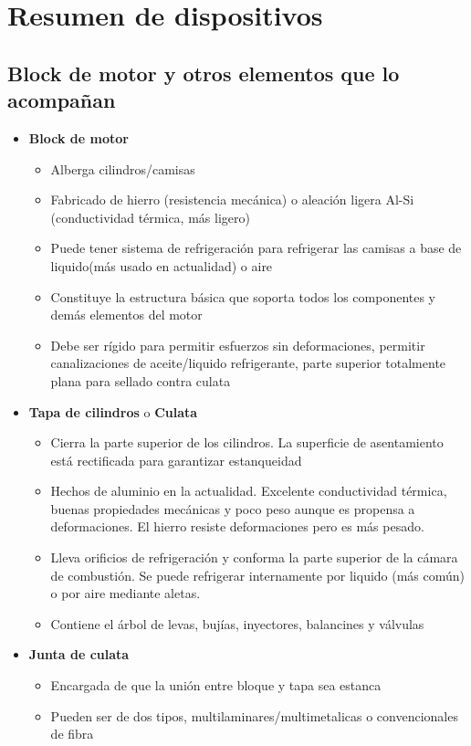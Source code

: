 \section{Resumen de dispositivos}
\subsection{Block de motor y otros elementos que lo acompañan}
\begin{itemize}
\item \textbf{Block de motor}
\begin{itemize}
\item Alberga cilindros/camisas
\item Fabricado de hierro (resistencia mecánica) o aleación ligera Al-Si (conductividad térmica, más ligero)
\item Puede tener sistema de refrigeración para refrigerar las camisas a base de liquido(más usado en actualidad) o aire
\item Constituye la estructura básica que soporta todos los componentes y demás elementos del motor
\item Debe ser rígido para permitir esfuerzos sin deformaciones, permitir canalizaciones de aceite/liquido refrigerante,  parte superior totalmente plana para sellado contra culata
\end{itemize}
\item \textbf{Tapa de cilindros} o \textbf{Culata}
\begin{itemize}
\item Cierra la parte superior de los cilindros. La superficie de asentamiento está rectificada para garantizar estanqueidad
\item Hechos de aluminio en la actualidad. Excelente conductividad térmica, buenas propiedades mecánicas y poco peso aunque es propensa a deformaciones. El hierro resiste deformaciones pero es más pesado.
\item Lleva orificios de refrigeración y conforma la parte superior de la cámara de combustión. Se puede refrigerar internamente por liquido (más común) o por aire mediante aletas. 
\item Contiene el árbol de levas, bujías, inyectores, balancines y válvulas
\end{itemize}
\item \textbf{Junta de culata}
\begin{itemize}
\item Encargada de que la unión entre bloque y tapa sea estanca
\item Pueden ser de dos tipos, multilaminares/multimetalicas o convencionales de fibra

\end{itemize}
\end{itemize}
